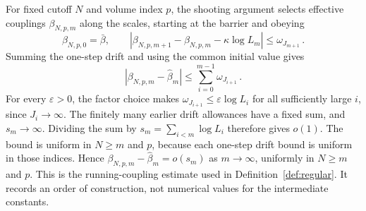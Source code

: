 For fixed cutoff $N$ and volume index $p$, the shooting argument selects effective couplings $\beta_{N,p,m}$ along the scales, starting at the barrier and obeying
\begin{equation*}
 \beta_{N,p,0}=\bar\beta,\qquad
 \left|\beta_{N,p,m+1}-\beta_{N,p,m}-\kappa\log L_m\right|
 \leq \omega_{J_{m+1}}\,.
\end{equation*}
Summing the one-step drift and using the common initial value gives
\begin{equation*}
 \left|\beta_{N,p,m}-\widehat\beta_m\right|
 \leq \sum_{i=0}^{m-1}\omega_{J_{i+1}}\,.
\end{equation*}
For every $\varepsilon>0$, the factor choice makes $\omega_{J_{i+1}}\leq\varepsilon\log L_i$ for all sufficiently large $i$, since $J_i\to\infty$. The finitely many earlier drift allowances have a fixed sum, and $s_m\to\infty$. Dividing the sum by $s_m=\sum_{i<m}\log L_i$ therefore gives $o(1)$. The bound is uniform in $N\geq m$ and $p$, because each one-step drift bound is uniform in those indices. Hence $\beta_{N,p,m}-\widehat\beta_m=o(s_m)$ as $m\to\infty$, uniformly in $N\geq m$ and $p$. This is the running-coupling estimate used in Definition~\ref{def:regular}. It records an order of construction, not numerical values for the intermediate constants.
